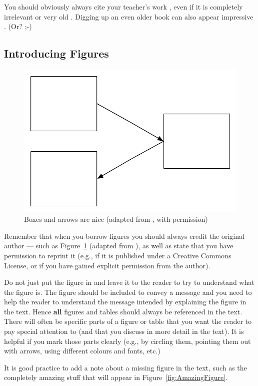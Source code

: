 You should obviously always cite your teacher's work \citep{BenyonEA:13}, 
even if it is completely irrelevant \citep{Das;Gamback:13a} or very old \citep{AlshawiEA:91b}.
Digging up an even older book can also appear impressive \citep{Diderichsen:57}.
(Or? ;-)

\subsection{Introducing Figures}

\begin{figure}[t!]
\centering
\includegraphics[width=0.5\columnwidth]{figs/figure1.pdf}
\caption[Boxes and arrows are nice]{Boxes and arrows are nice (adapted from \citealp{Authorson;Bobsen:10}, with permission)}
\label{fig:BoxesAndArrowsAreNice}
\end{figure}

Remember that when you borrow figures you should always credit the original author --- such as 
Figure~\ref{fig:BoxesAndArrowsAreNice} (adapted from \citealp{Authorson;Bobsen:10}),
as well as state that you have permission to reprint it (e.g., if it is published under a Creative Commons License,
or if you have gained explicit permission from the author). 

Do not just put the figure in and leave it to the reader to try to understand what the figure is. 
The figure should be included to convey a message and you need to help the reader to understand the message 
intended by explaining the figure in the text. Hence {\bf all} figures and tables should always be referenced in the text.
There will often be specific parts of a figure or table that you want the reader to pay special attention to (and that you
discuss in more detail in the text). It is helpful if you mark those parts clearly (e.g., by circling them, pointing them out
with arrows, using different colours and fonts, etc.)

It is good practice to add a note about a missing figure in the text,
such as the completely amazing stuff that will appear in Figure~\ref{fig:AmazingFigure}.

